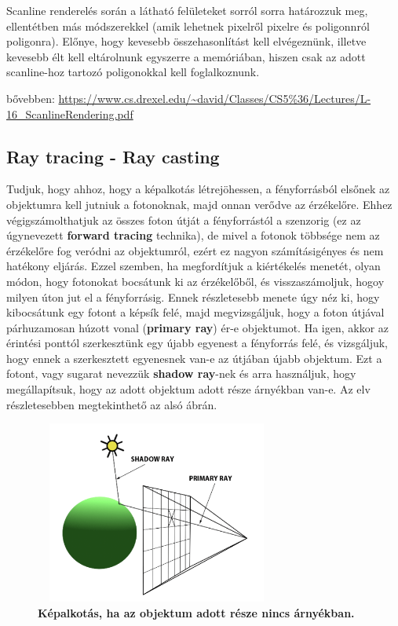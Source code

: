 \documentclass[12pt]{article}
\theoremstyle{plain}
\begin{document}
Scanline renderelés során a látható felületeket sorról sorra határozzuk meg, ellentétben más módszerekkel (amik lehetnek pixelről pixelre és poligonnról poligonra). 
Előnye, hogy kevesebb összehasonlítást kell elvégeznünk, illetve kevesebb élt kell eltárolnunk egyszerre a memóriában, hiszen csak az adott scanline-hoz tartozó poligonokkal kell foglalkoznunk.


bővebben: \url{https://www.cs.drexel.edu/~david/Classes/CS5%36/Lectures/L-16_ScanlineRendering.pdf}

\subsection{Ray tracing - Ray casting}

Tudjuk, hogy ahhoz, hogy a képalkotás létrejöhessen, a fényforrásból elsőnek az objektumra kell jutniuk a fotonoknak, majd onnan verődve az érzékelőre. Ehhez végigszámolthatjuk az összes foton útját a fényforrástól a szenzorig (ez az úgynevezett \textbf{forward tracing} technika), de mivel a fotonok többsége nem az érzékelőre fog veródni az objektumról, ezért ez nagyon számításigényes és nem hatékony eljárás. Ezzel szemben, ha megfordítjuk a kiértékelés menetét, olyan módon, hogy fotonokat bocsátunk ki az érzékelőből, és visszaszámoljuk, hogoy milyen úton jut el a fényforrásig. Ennek részletesebb menete úgy néz ki, hogy kibocsátunk egy fotont a képsík felé, majd megvizsgáljuk, hogy a foton útjával párhuzamosan húzott vonal (\textbf{primary ray}) ér-e objektumot. Ha igen, akkor az érintési ponttól szerkesztünk egy újabb egyenest a fényforrás felé, és vizsgáljuk, hogy ennek a szerkesztett egyenesnek van-e az útjában újabb objektum. Ezt a fotont, vagy sugarat nevezzük \textbf{shadow ray}-nek és arra használjuk, hogy megállapítsuk, hogy az adott objektum adott része árnyékban van-e. Az elv részletesebben megtekinthető az alsó ábrán.

\begin{figure}[H]
   \centering
   \includegraphics[width=8cm, height=6cm]{media/shadow1.PNG}
   \caption{\textbf{Képalkotás, ha az objektum adott része nincs árnyékban.}}
   \label{fig:GeneralDiagram}
\end{figure}
\end{document}
